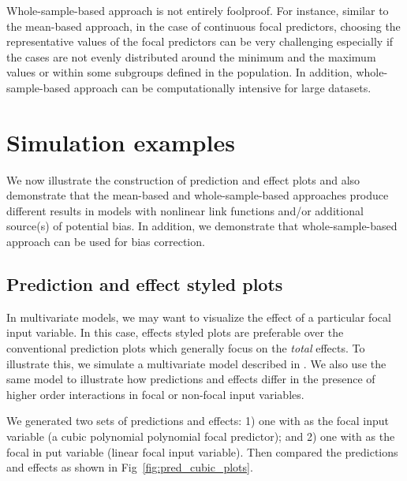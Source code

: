 Whole-sample-based approach is not entirely foolproof. For instance, similar to the mean-based approach, in the case of continuous focal predictors, choosing the representative values of the focal predictors can be very challenging especially if the cases are not evenly distributed around the minimum and the maximum values or within some subgroups defined in the population. In addition, whole-sample-based approach can be computationally intensive for large datasets.

\section{Simulation examples}

We now illustrate the construction of prediction and effect plots and also demonstrate that the mean-based and whole-sample-based approaches produce different results in models with nonlinear link functions and/or additional source(s) of potential bias. In addition, we demonstrate that whole-sample-based approach can be used for bias correction.

\subsection{Prediction and effect styled plots}

In multivariate models, we may want to visualize the effect of a particular focal input variable. In this case, effects styled plots are preferable over the conventional prediction plots which generally focus on the \emph{total} effects. To illustrate this, we simulate a multivariate model described in . We also use the same model to illustrate how predictions and effects differ in the presence of higher order interactions in focal or non-focal input variables.

We generated two sets of predictions and effects: 1) one with  as the focal input variable (a cubic polynomial polynomial focal predictor); and 2) one with  as the focal in put variable (linear focal input variable). Then compared the predictions and effects as shown in Fig~\ref{fig:pred_cubic_plots}.

